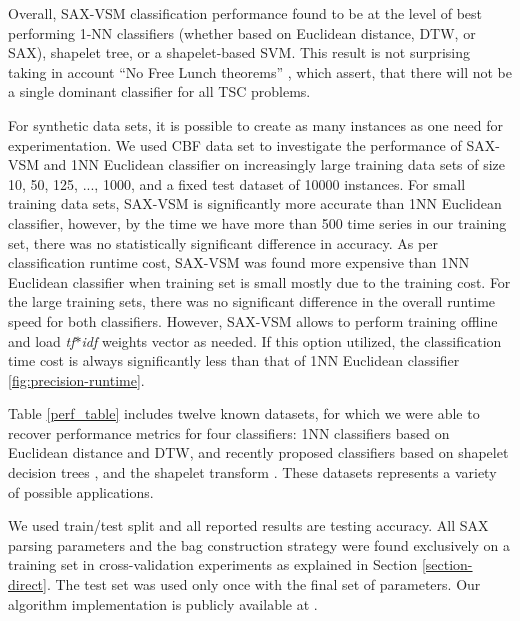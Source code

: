 \documentclass{llncs}
\begin{document}
Overall, SAX-VSM classification performance found to be at the level of best
performing 1-NN classifiers (whether based on Euclidean distance, DTW, or SAX), shapelet tree, or a
shapelet-based SVM. This result is not surprising taking in account ``No Free Lunch theorems''
\cite{nfl}, which assert, that there will not be a single dominant classifier for all TSC problems.

For synthetic data sets, it is possible to create as many instances as one need for experimentation.
We used CBF data set \cite{cbf} to investigate the performance of SAX-VSM and 1NN Euclidean
classifier on increasingly large training data sets of size 10, 50, 125, ..., 1000, and a fixed test
dataset of 10000 instances. For small training data sets, SAX-VSM is signiﬁcantly more accurate
than 1NN Euclidean classifier, however, by the time we have more than 500 time series in
our training set, there was no statistically signiﬁcant diﬀerence in accuracy. 
As per classification runtime cost, SAX-VSM was found more expensive than 1NN Euclidean classifier
when training set is small mostly due to the training cost. For the large training sets, there was
no significant difference in the overall runtime speed for both classifiers. 
However, SAX-VSM allows to perform training offline and load \textit{tf$\ast$idf} weights vector as
needed. If this option utilized, the classification time cost is always significantly less than that
of 1NN Euclidean classifier \ref{fig:precision-runtime}.

Table \ref{perf_table} includes twelve known datasets, for which we were able to recover performance
metrics for four classifiers: 1NN classifiers based on Euclidean distance and DTW, and
recently proposed classifiers based on shapelet decision trees \cite{shapelet} \cite{logical}, and
the shapelet transform \cite{bagnal}. These datasets represents a variety of possible applications. 

We used train/test split and all reported
results are testing accuracy. All SAX parsing parameters and the bag construction strategy were
found exclusively on a training set in cross-validation experiments as
explained in Section \ref{section-direct}. The test set was used only once with the final set of
parameters. Our algorithm implementation is publicly available at \cite{jmotif}.
\end{document}
